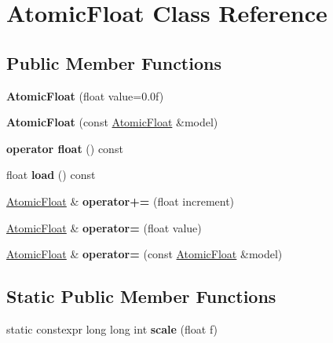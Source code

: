 \hypertarget{classAtomicFloat}{}\section{Atomic\+Float Class Reference}
\label{classAtomicFloat}
\subsection*{Public Member Functions}
\begin{DoxyCompactItemize}
\item 
\mbox{\label{classAtomicFloat_af11cff090e6c3e37996efe67157a9301}} 
{\bfseries Atomic\+Float} (float value=0.\+0f)
\item 
\mbox{\label{classAtomicFloat_a0346bea59f0fd4f4876e4c76dc5783f5}} 
{\bfseries Atomic\+Float} (const \hyperlink{classAtomicFloat}{Atomic\+Float} \&model)
\item 
\mbox{\label{classAtomicFloat_a396866e22a2a7cd5b9c49149f4014df3}} 
{\bfseries operator float} () const
\item 
\mbox{\label{classAtomicFloat_a38d6e55da00fa162185fc2bfaef16239}} 
float {\bfseries load} () const
\item 
\mbox{\label{classAtomicFloat_a55fb3f675d4c44e80998b228cce112ce}} 
\hyperlink{classAtomicFloat}{Atomic\+Float} \& {\bfseries operator+=} (float increment)
\item 
\mbox{\label{classAtomicFloat_aa913c328fe196661d56406bc1902fa2b}} 
\hyperlink{classAtomicFloat}{Atomic\+Float} \& {\bfseries operator=} (float value)
\item 
\mbox{\label{classAtomicFloat_abe03f0bf79b3f0eebcfec3110dfa0cd1}} 
\hyperlink{classAtomicFloat}{Atomic\+Float} \& {\bfseries operator=} (const \hyperlink{classAtomicFloat}{Atomic\+Float} \&model)
\end{DoxyCompactItemize}
\subsection*{Static Public Member Functions}
\begin{DoxyCompactItemize}
\item 
\mbox{\label{classAtomicFloat_ab842d3b53d55a84deac19875cb861cf2}} 
static constexpr long long int {\bfseries scale} (float f)
\end{DoxyCompactItemize}
